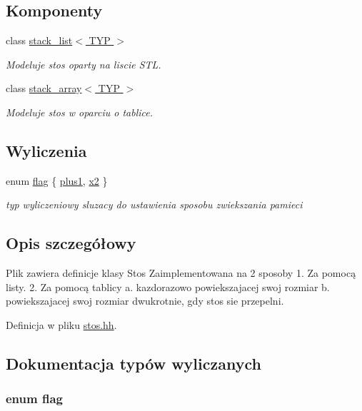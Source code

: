 \subsection*{\-Komponenty}
\begin{DoxyCompactItemize}
\item 
class \hyperlink{classstack__list}{stack\-\_\-list$<$ T\-Y\-P $>$}
\begin{DoxyCompactList}\small\item\em \-Modeluje stos oparty na liscie \-S\-T\-L. \end{DoxyCompactList}\item 
class \hyperlink{classstack__array}{stack\-\_\-array$<$ T\-Y\-P $>$}
\begin{DoxyCompactList}\small\item\em \-Modeluje stos w oparciu o tablice. \end{DoxyCompactList}\end{DoxyCompactItemize}
\subsection*{\-Wyliczenia}
\begin{DoxyCompactItemize}
\item 
enum \hyperlink{stos_8hh_a7847560c748814fd3070e9149a9578bd}{flag} \{ \hyperlink{stos_8hh_a7847560c748814fd3070e9149a9578bda4d2a3aa75111d5d02328fb5d495729c2}{plus1}, 
\hyperlink{stos_8hh_a7847560c748814fd3070e9149a9578bdac9b6e8d1af7ce8ae332595ccf954567c}{x2}
 \}
\begin{DoxyCompactList}\small\item\em typ wyliczeniowy sluzacy do ustawienia sposobu zwiekszania pamieci \end{DoxyCompactList}\end{DoxyCompactItemize}


\subsection{\-Opis szczegółowy}
\-Plik zawiera definicje klasy {\ttfamily \-Stos} \-Zaimplementowana na 2 sposoby 1. \-Za pomocą listy. 2. \-Za pomocą tablicy a. kazdorazowo powiekszajacej swoj rozmiar b. powiekszajacej swoj rozmiar dwukrotnie, gdy stos sie przepelni. 

\-Definicja w pliku \hyperlink{stos_8hh_source}{stos.\-hh}.



\subsection{\-Dokumentacja typów wyliczanych}
\hypertarget{stos_8hh_a7847560c748814fd3070e9149a9578bd}{
\subsubsection[{flag}]{\setlength{\rightskip}{0pt plus 5cm}enum {\bf flag}}}\label{stos_8hh_a7847560c748814fd3070e9149a9578bd}


